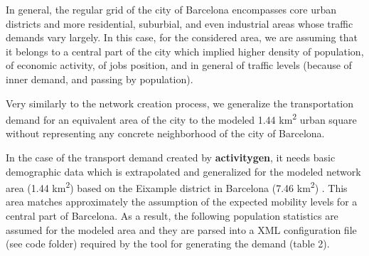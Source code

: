 \documentclass[11pt]{article}
\begin{document}
In general, the regular grid of the city of Barcelona encompasses core urban districts and more residential, suburbial, and even industrial areas whose traffic demands vary largely. In this case, for the considered area, we are assuming that it belongs to a central part of the city which implied higher density of population, of economic activity, of jobs position, and in general of traffic levels (because of inner demand, and passing by population).

Very similarly to the network creation process, we generalize the transportation demand for an equivalent area of the city to the modeled 1.44 km\textsuperscript{2} urban square without representing any concrete neighborhood of the city of Barcelona.

In the case of the transport demand created by \textbf{activitygen}, it needs basic demographic data which is extrapolated and generalized for the modeled network area (1.44 km\textsuperscript{2}) based on the Eixample district in Barcelona (7.46 km\textsuperscript{2}) \citep{AjuntamentdeBarcelona2018, AreadeBarcelona.AutoritatdelTransportMetropolita2020, DepartamentdAnalisiOficinaMunicipaldeDades.AjuntamentdeBarcelona2020}. This area matches approximately the assumption of the expected mobility levels for a central part of Barcelona. As a result, the following population statistics are assumed for the modeled area and they are parsed into a XML configuration file (see code folder) required by the tool for generating the demand (table 2).

\begin{table}[h!]
\centering
\caption{Population statistics for the modeled area used in ACTIVITYGEN}
\label{tab:2pop-stats}
\end{table}
\end{document}
